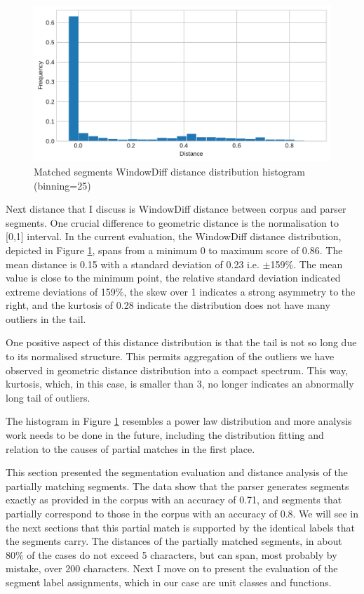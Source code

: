     \begin{figure}[!ht]
    \centering
    \includegraphics[width=.85\textwidth]{evaluation-results/figures/distance-distribution-histogram-WindowDiff-25.pdf}
    \caption{Matched segments WindowDiff distance distribution histogram (binning=25)}
    \label{fig:distance-distribution-histogram-WindowDiff-25}
    \end{figure}
    
    Next distance that I discuss is WindowDiff distance between corpus and parser segments. One crucial difference to geometric distance is the normalisation to [0,1] interval. In the current evaluation, the WindowDiff distance distribution, depicted in Figure \ref{fig:distance-distribution-histogram-WindowDiff-25}, spans from a minimum 0 to maximum score of 0.86. The mean distance is 0.15 with a standard deviation of 0.23 i.e. $\pm$159\%. The mean value is close to the minimum point, the relative standard deviation indicated extreme deviations of 159\%, the skew over 1 indicates a strong asymmetry to the right, and the kurtosis of 0.28 indicate the distribution does not have many outliers in the tail. 
    
    One positive aspect of this distance distribution is that the tail is not so long due to its normalised structure. This permits aggregation of the outliers we have observed in geometric distance distribution into a compact spectrum. This way, kurtosis, which, in this case, is smaller than 3, no longer indicates an abnormally long tail of outliers. 
    
    The histogram in Figure \ref{fig:distance-distribution-histogram-WindowDiff-25} resembles a power law distribution and more analysis work needs to be done in the future, including the distribution fitting and relation to the causes of partial matches in the first place. 
    
    This section presented the segmentation evaluation and distance analysis of the partially matching segments. The data show that the parser generates segments exactly as provided in the corpus with an accuracy of 0.71, and segments that partially correspond to those in the corpus with an accuracy of 0.8. We will see in the next sections that this partial match is supported by the identical labels that the segments carry. The distances of the partially matched segments, in about 80\% of the cases do not exceed 5 characters, but can span, most probably by mistake, over 200 characters. Next I move on to present the evaluation of the segment label assignments, which in our case are unit classes and functions.


